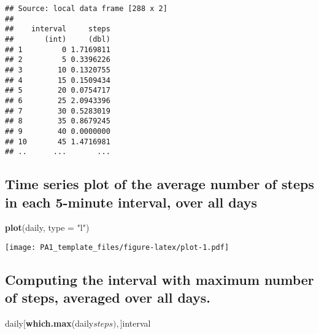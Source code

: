 \documentclass[]{article}
\newenvironment{Shaded}{\begin{snugshade}}{\end{snugshade}}
\newcommand{\KeywordTok}[1]{\textcolor[rgb]{0.13,0.29,0.53}{\textbf{{#1}}}}
\newcommand{\DataTypeTok}[1]{\textcolor[rgb]{0.13,0.29,0.53}{{#1}}}
\newcommand{\StringTok}[1]{\textcolor[rgb]{0.31,0.60,0.02}{{#1}}}
\newcommand{\NormalTok}[1]{{#1}}
\begin{document}
\begin{Shaded}
\end{Shaded}

\begin{verbatim}
## Source: local data frame [288 x 2]
## 
##    interval     steps
##       (int)     (dbl)
## 1         0 1.7169811
## 2         5 0.3396226
## 3        10 0.1320755
## 4        15 0.1509434
## 5        20 0.0754717
## 6        25 2.0943396
## 7        30 0.5283019
## 8        35 0.8679245
## 9        40 0.0000000
## 10       45 1.4716981
## ..      ...       ...
\end{verbatim}

\subsection{Time series plot of the average number of steps in each
5-minute interval, over all
days}\label{time-series-plot-of-the-average-number-of-steps-in-each-5-minute-interval-over-all-days}

\begin{Shaded}
\begin{Highlighting}[]
\KeywordTok{plot}\NormalTok{(daily, }\DataTypeTok{type =} \StringTok{"l"}\NormalTok{)}
\end{Highlighting}
\end{Shaded}

\texttt{[image: PA1\_template\_files/figure-latex/plot-1.pdf]}

\subsection{Computing the interval with maximum number of steps,
averaged over all
days.}\label{computing-the-interval-with-maximum-number-of-steps-averaged-over-all-days.}

\begin{Shaded}
\begin{Highlighting}[]
\NormalTok{daily[}\KeywordTok{which.max}\NormalTok{(daily$steps), ]$interval}
\end{Highlighting}
\end{Shaded}
\end{document}
